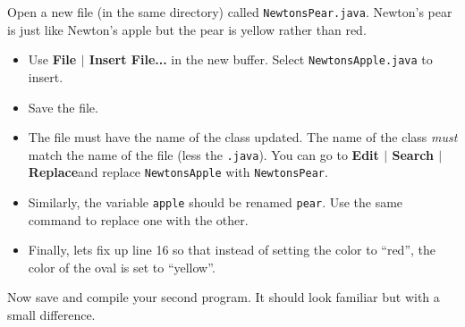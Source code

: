 \documentclass[12pt,twoside]{memoir}
\newcommand\code[1]{\lstinline^#1^}
\newcommand\fname[1]{\lstinline^#1^}
\newenvironment{LabExercises}{%
\renewcommand{\ExerciseListName}{Question}%
\renewcommand{\ExerciseListHeader}{\textbf{%
   Checkpoint\ExerciseHeaderNB. }}
\begin{ExerciseList}}%
{\end{ExerciseList}}
\begin{document}
\begin{LabExercises}
Open a new file (in the same directory) called
\texttt{NewtonsPear.java}. Newton's pear is just like Newton's apple
but the pear is yellow rather than red. 

\begin{itemize}
\item Use \textbf{File $|$ Insert File...} in the new buffer. Select
  \texttt{NewtonsApple.java} to insert.
\item Save the file.
\item The file must have the name of the class updated. The name of
the class \emph{must} match the name of the file (less the
\fname{.java}). You can go to \textbf{Edit $|$ Search $|$ Replace}and
replace \code{NewtonsApple} with \code{NewtonsPear}.  
\item Similarly, the variable \code{apple} should be renamed
  \code{pear}. Use the same command to replace one with the other.
\item Finally, lets fix up line 16 so that instead of setting the
  color to ``red'', the color of the oval is set to ``yellow''.
\end{itemize}

Now save and compile your second program. It should look familiar but
with a small difference.

\end{LabExercises}
\end{document}
